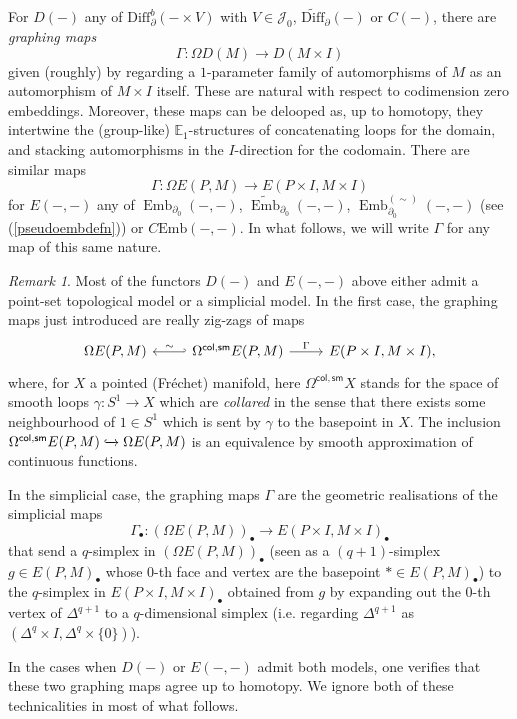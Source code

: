\documentclass[a4paper, oneside]{amsart}
\newcommand{\diff}{\mathrm{Diff}}
\newcommand{\bdiff}{\widetilde{\mathrm{Diff}}}
\newcommand{\emb}{\operatorname{Emb}}
\newcommand{\bemb}{\widetilde{\operatorname{Emb}}}
\newcommand{\cemb}{C\mathrm{Emb}}
\newcommand{\1}{\mathds{1}}
\theoremstyle{remark}
\newtheorem{rem}[thm]{Remark}%
\theoremstyle{definition}
\numberwithin{equation}{section}
\begin{document}
For $D(-)$ any of $\diff_\partial^b(-\times V)$ with $V\in \mathcal J_0$, $\bdiff_\partial(-)$ or $C(-)$, there are \textit{graphing maps}
$$
\Gamma: \Omega D(M)\longrightarrow D(M\times I)
$$
given (roughly) by regarding a $1$-parameter family of automorphisms of $M$ as an automorphism of $M\times I$ itself. These are natural with respect to codimension zero embeddings. Moreover, these maps can be delooped as, up to homotopy, they intertwine the (group-like) $\mathbb{E}_1$-structures of concatenating loops for the domain, and stacking automorphisms in the $I$-direction for the codomain. There are similar maps
\begin{equation}\label{graphmapemb}
\Gamma: \Omega E(P,M)\longrightarrow E(P\times I, M\times I)
\end{equation}
for $E(-,-)$ any of $\emb_{\partial_0}(-,-)$, $\bemb_{\partial_0}(-,-)$, $\emb_{\partial_0}^{(\sim)}(-,-)$ (see (\ref{pseudoembdefn})) or $\cemb(-,-)$. In what follows, we will write $\Gamma$ for any map of this same nature. 


\begin{rem}\label{colsmrem}
    Most of the functors $D(-)$ and $E(-,-)$ above either admit a point-set topological model or a simplicial model. In the first case, the graphing maps just introduced are really zig-zags of maps
    $$
    \begin{tikzcd}
    \Omega E(P,M) &\lar[hook', "\sim"'] \Omega^{\mathsf{col}, \mathsf{sm} }E(P,M)\rar["\Gamma"] &E(P\times I,M\times I),
\end{tikzcd}
$$
where, for $X$ a pointed (Fréchet) manifold, here $\Omega^{\mathsf{col}, \mathsf{sm}}X$ stands for the space of smooth loops $\gamma: S^1\to X$ which are \textit{collared} in the sense that there exists some neighbourhood of $1\in S^1$ which is sent by $\gamma$ to the basepoint in $X$. The inclusion $\Omega^{\mathsf{col}, \mathsf{sm} }E(P,M)\xhookrightarrow{}\Omega E(P,M)$ is an equivalence by smooth approximation of continuous functions. 

In the simplicial case, the graphing maps $\Gamma$ are the geometric realisations of the simplicial maps
$$
\Gamma_\bullet: (\Omega E(P,M))_\bullet\longrightarrow E(P\times I, M\times I)_\bullet
$$
that send a $q$-simplex in $(\Omega E(P,M))_\bullet$ (seen as a $(q+1)$-simplex $g\in E(P,M)_\bullet$ whose $0$-th face and vertex are the basepoint $*\in E(P,M)_\bullet$) to the $q$-simplex in $E(P\times I,M\times I)_\bullet$ obtained from $g$ by expanding out the $0$-th vertex of $\Delta^{q+1}$ to a $q$-dimensional simplex (i.e. regarding $\Delta^{q+1}$ as $(\Delta^q\times I, \Delta^q\times\{0\})$). 

In the cases when $D(-)$ or $E(-,-)$ admit both models, one verifies that these two graphing maps agree up to homotopy. We ignore both of these technicalities in most of what follows.
\end{rem}
\end{document}
